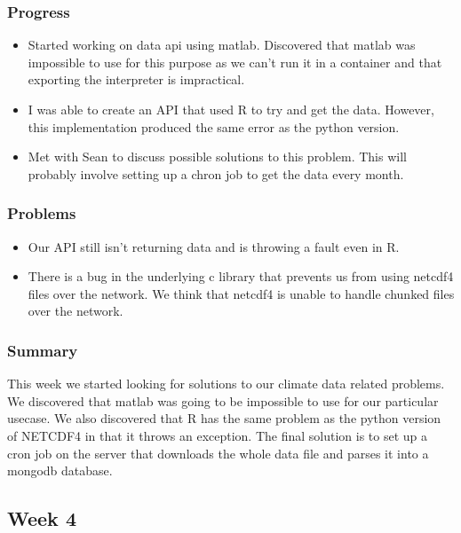 \documentclass[onecolumn, draftclsnofoot,10pt, compsoc]{article}
\begin{document}
			\subsubsection{Progress}
			    \begin{itemize}
			        \item Started working on data api using matlab. Discovered that matlab was impossible to use for this purpose as we can't run it in a container and that exporting the interpreter is impractical.\\
			        \item I was able to create an API that used R to try and get the data. However, this implementation produced the same error as the python version.\\
			        \item Met with Sean to discuss possible solutions to this problem. This will probably involve setting up a chron job to get the data every month.\\
			    \end{itemize}
			\subsubsection{Problems}
			    \begin{itemize}
			        \item Our API still isn't returning data and is throwing a fault even in R.\\
			        \item There is a bug in the underlying c library that prevents us from using netcdf4 files over the network. We think that netcdf4 is unable to handle chunked files over the network.\\
			    \end{itemize}
			\subsubsection{Summary} This week we started looking for solutions to our climate data related problems. We discovered that matlab was going to be impossible to use for our particular usecase. We also discovered that R has the same problem as the python version of NETCDF4 in that it throws an exception. The final solution is to set up a cron job on the server that downloads the whole data file and parses it into a mongodb database.\\
			
		\subsection{Week 4}
\end{document}
